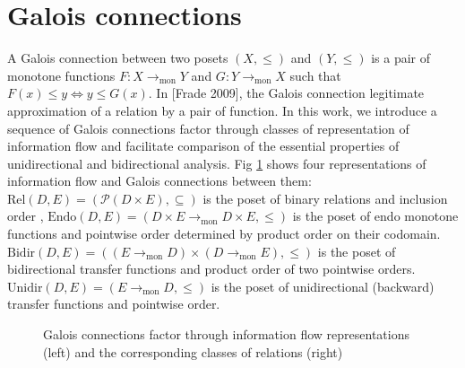 \documentclass{easychair}
\theoremstyle{definition}
\newcommand{\Pow}{\mathcal{P}}
\newcommand{\Rel}{\mathrm{Rel}}
\newcommand{\Endo}{\mathrm{Endo}}
\newcommand{\Bidir}{\mathrm{Bidir}}
\newcommand{\Unidir}{\mathrm{Unidir}}
\newcommand{\tomon}{\to_{\mathrm{mon}}}
\newcommand{\rotsubseteq}{\rotatebox[origin=c]{90}{$\subseteq$}}
\begin{document}
\section{Galois connections}
A Galois connection between two posets $(X , \leq)$ and $(Y , \leq)$ is a pair
of monotone functions $F : X \tomon Y$ and $G : Y \tomon X$ such that $F(x) \leq y \iff y \leq G(x)$.
In [Frade 2009], the Galois connection legitimate approximation of a
relation by a pair of function. In this work, we introduce a sequence of
Galois connections factor through classes of representation of
information flow and facilitate comparison of the essential properties
of unidirectional and bidirectional analysis. Fig \ref{fig:galois-connections} shows four representations of information
flow and Galois connections between them: $\Rel(D, E)= (\Pow(D \times E), \subseteq)$
is the poset of binary relations and inclusion order , $\Endo(D , E) = (D \times E \tomon D \times E, \leq)$
is the poset of endo monotone functions and pointwise order determined
by product order on their codomain. $\Bidir(D , E) = ((E \tomon D) \times (D \tomon E), \leq)$ is the poset of bidirectional transfer functions and product
order of two pointwise orders. $\Unidir(D , E) = (E \tomon D , \leq)$ is the poset
of unidirectional (backward) transfer functions and pointwise order.
\begin{figure}[htbp]
  \centering
  \label{fig:galois-connections}
  \caption{Galois connections factor through information flow representations (left) and the corresponding classes of relations (right)}
\end{figure}
\end{document}
